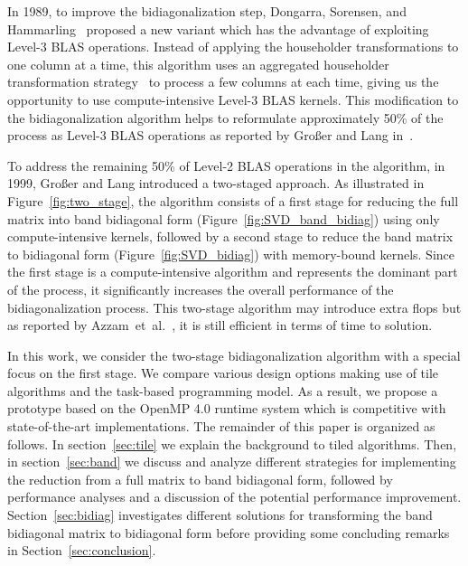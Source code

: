 In 1989, to improve the bidiagonalization step,
Dongarra, Sorensen, and Hammarling~\cite{dongarra1989block}
proposed a new variant which has the advantage of exploiting
Level-3 BLAS operations.
Instead of applying the householder transformations to
one column at a time,
this algorithm uses an aggregated householder transformation
strategy~\cite{bischof1987wy} to process a few columns at each time,
giving us the opportunity to use compute-intensive Level-3 BLAS kernels.
This modification to the bidiagonalization algorithm helps
to reformulate approximately 50\% of the process as Level-3 BLAS operations
as reported by Gro{\ss}er and Lang in~\cite{grosser1999efficient}.

To address the remaining 50\% of Level-2 BLAS operations in the
algorithm, in 1999, Gro{\ss}er and Lang introduced a two-staged
approach.
As illustrated in Figure~\ref{fig:two_stage}, the algorithm consists of
a first stage for reducing the full matrix into
band bidiagonal form (Figure~\ref{fig:SVD_band_bidiag}) using only
compute-intensive kernels,
followed by a second stage to reduce the band
matrix to bidiagonal form (Figure~\ref{fig:SVD_bidiag}) with
memory-bound kernels.
Since the first stage is a compute-intensive
algorithm and represents the dominant part of the process,
it significantly increases the overall performance of the
bidiagonalization process.
This two-stage algorithm may introduce extra flops
but as reported by Azzam~et~al\@.~\cite{haidar2013improved},
it is still efficient in terms of time to solution.

In this work, we consider the two-stage bidiagonalization algorithm
with a special focus on the first stage.
We compare various design options making use of tile algorithms and
the task-based programming model.
As a result,
we propose a prototype based on the OpenMP 4.0 runtime system which is
competitive with state-of-the-art implementations.
The remainder of this paper is organized as follows.
In section~\ref{sec:tile} we explain the background to tiled algorithms.
Then, in section~\ref{sec:band} we discuss and analyze
different strategies for implementing the
reduction from a full matrix to band bidiagonal form,
followed by performance analyses and a discussion of
the potential performance improvement.
Section~\ref{sec:bidiag} investigates different solutions
for transforming the band bidiagonal matrix
to bidiagonal form before providing some concluding
remarks in Section~\ref{sec:conclusion}.

